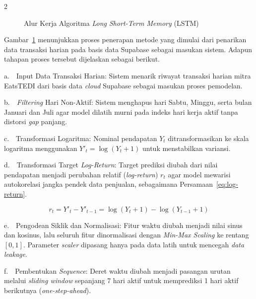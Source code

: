 \documentclass[12pt, a4paper, onecolumn, oneside]{report}
\begin{document}
\begin{spacing}{2}
\begin{figure}[H]
{%
    }
    \caption{Alur Kerja Algoritma \textit{Long Short-Term Memory} (LSTM)}
    \label{fig:lstm_alur}
\end{figure}

Gambar~\ref{fig:lstm_alur} menunjukkan proses penerapan metode yang dimulai dari penarikan data transaksi harian pada basis data Supabase sebagai masukan sistem. Adapun tahapan proses tersebut dijelaskan sebagai berikut.

\noindent a.~~Input Data Transaksi Harian: Sistem menarik riwayat transaksi harian mitra EatsTEDI dari basis data \textit{cloud} Supabase sebagai masukan proses pemodelan.

\noindent b.~~\textit{Filtering} Hari Non-Aktif: Sistem menghapus hari Sabtu, Minggu, serta bulan Januari dan Juli agar model dilatih murni pada indeks hari kerja aktif tanpa distorsi \textit{gap} panjang.

\noindent c.~~Transformasi Logaritma: Nominal pendapatan $Y_t$ ditransformasikan ke skala logaritma menggunakan $Y'_t = \log(Y_t + 1)$ untuk menstabilkan variansi.

\noindent d.~~Transformasi Target \textit{Log-Return}: Target prediksi diubah dari nilai pendapatan menjadi perubahan relatif (\textit{log-return}) $r_t$ agar model mewarisi autokorelasi jangka pendek data penjualan, sebagaimana Persamaan~\ref{eq:log-return}.

\begin{equation}
    r_t = Y'_t - Y'_{t-1} = \log(Y_t + 1) - \log(Y_{t-1} + 1)
    \label{eq:log-return}
\end{equation}

\noindent e.~~Pengodean Siklik dan Normalisasi: Fitur waktu diubah menjadi nilai sinus dan kosinus, lalu seluruh fitur dinormalisasi dengan \textit{Min-Max Scaling} ke rentang $[0,1]$. Parameter \textit{scaler} dipasang hanya pada data latih untuk mencegah \textit{data leakage}.

\noindent f.~~Pembentukan \textit{Sequence}: Deret waktu diubah menjadi pasangan urutan melalui \textit{sliding window} sepanjang 7 hari aktif untuk memprediksi 1 hari aktif berikutnya (\textit{one-step-ahead}).


\end{spacing}
\end{document}
